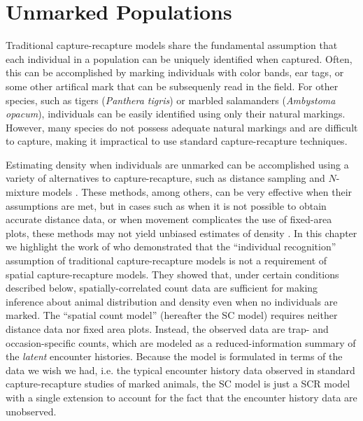 \chapter{Unmarked Populations}
\label{chapt.scr-unmarked}

\vspace{0.3cm}


Traditional capture-recapture models share the fundamental
assumption that each individual in a population can be uniquely
identified when captured. Often, this can be accomplished
by marking individuals with color bands, ear tags, or some other
artifical mark that can be subsequenly read in the field. For other
species, such as tigers (\textit{Panthera tigris}) or
marbled salamanders (\textit{Ambystoma opacum}),
individuals can be easily identified
using only their natural markings. However, many species
do not possess adequate natural markings and are
difficult to capture, making it impractical to use standard
capture-recapture techniques.

Estimating density when individuals are unmarked can be accomplished
using a variety of alternatives to capture-recapture, such as distance
sampling \citep{buckland_etal:2001} and $N$-mixture models
\citep{royle:2004biom}. These methods, among others, can be
very effective when their assumptions are met, but in cases such as
when it is not possible to obtain accurate distance data, or when
movement complicates the use of fixed-area plots,
these methods may not yield unbiased estimates of density
\citep{chandler_etal:2011}. In this chapter we highlight the work of
\citet{chandler_royle:2012} who demonstrated that the ``individual
recognition'' assumption of traditional capture-recapture models is not a
requirement of spatial capture-recapture models. They showed that,
under certain conditions described below, spatially-correlated count
data are sufficient for making inference about animal distribution and
density even when no individuals are marked.
The \citet{chandler_royle:2012} ``spatial count model'' (hereafter the SC
model) requires neither distance data nor fixed area plots. Instead,
the observed data are trap- and occasion-specific counts, which
are modeled as a reduced-information summary of the \textit{latent}
encounter histories. Because the model is formulated in terms of the
data we wish we had, i.e. the typical encounter history data observed
in standard capture-recapture studies of marked animals, the SC model
is just a SCR model with a single extension to account for the fact
that the encounter history data are unobserved.

